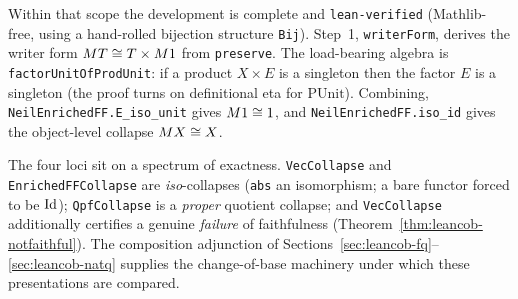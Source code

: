 Within that scope the development is complete and \texttt{lean-verified} (Mathlib-free, using a hand-rolled bijection structure \texttt{Bij}). Step~1, \texttt{writerForm}, derives the writer form $M T\cong T\times M1$ from \texttt{preserve}. The load-bearing algebra is \texttt{factorUnitOfProdUnit}: if a product $X\times E$ is a singleton then the factor $E$ is a singleton (the proof turns on definitional eta for $\mathrm{PUnit}$). Combining, \texttt{NeilEnrichedFF.E\_iso\_unit} gives $M1\cong1$, and \texttt{NeilEnrichedFF.iso\_id} gives the object-level collapse $M X\cong X$.

\begin{remark}
The four loci sit on a spectrum of exactness. \texttt{VecCollapse} and \texttt{EnrichedFFCollapse} are \emph{iso}-collapses (\texttt{abs} an isomorphism; a bare functor forced to be $\mathrm{Id}$); \texttt{QpfCollapse} is a \emph{proper} quotient collapse; and \texttt{VecCollapse} additionally certifies a genuine \emph{failure} of faithfulness (Theorem~\ref{thm:leancob-notfaithful}). The composition adjunction of Sections~\ref{sec:leancob-fq}--\ref{sec:leancob-natq} supplies the change-of-base machinery under which these presentations are compared.
\end{remark}


